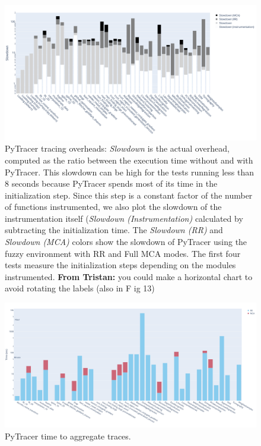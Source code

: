 \documentclass[11pt]{article}
\newcommand{\tristan}[1]{\color{orange}\textbf{From Tristan:} #1\color{black}\xspace}
\newcommand{\pytracer}[0]{PyTracer\xspace}
\begin{document}
\begin{figure}
    \centering
    \includegraphics[width=\linewidth]{figure/performance.pdf}
    \caption{
    \pytracer tracing overheads: \textit{Slowdown} is the actual overhead, computed as the ratio between the execution time without and with \pytracer. This slowdown can be high for the tests running less than 8 seconds because \pytracer spends most of its time in the initialization step. Since this step is a constant factor of the number of functions instrumented, we also plot the slowdown of the instrumentation itself (\textit{Slowdown (Instrumentation)} calculated by subtracting the initialization time.
    The \textit{Slowdown (RR)} and \textit{Slowdown (MCA)} colors show the slowdown of \pytracer 
    using the fuzzy environment with RR and Full MCA modes.
    The first four tests measure the initialization steps depending on the modules instrumented. \tristan{you could make a horizontal chart to avoid rotating the labels (also in F  ig 13)}
    }
    \label{fig:performances}
\end{figure}

\begin{figure}
    \centering
    \includegraphics[width=\linewidth]{figure/parsing_time.pdf}
    \caption{\pytracer time to aggregate traces.}
    \label{fig:performance_parsing_time}
\end{figure}
\end{document}
